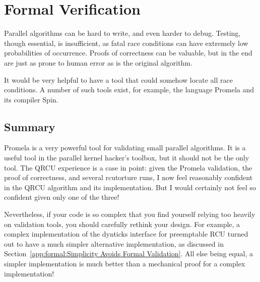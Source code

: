 
\chapter{Formal Verification}
\label{app:formal:Formal Verification}


Parallel algorithms can be hard to write, and even harder to debug.
Testing, though essential, is insufficient, as fatal race conditions
can have extremely low probabilities of occurrence.
Proofs of correctness can be valuable, but in the end are just as
prone to human error as is the original algorithm.

It would be very helpful to have a tool that could somehow locate
all race conditions.
A number of such tools exist, for example,
the language Promela and its compiler Spin.




\section{Summary}
\label{app:formal:Summary}

Promela is a very powerful tool for validating small parallel algorithms.
It is a useful tool in the parallel kernel hacker's toolbox, but
it should not be the only tool.
The QRCU experience is a case in point: given the Promela validation,
the proof of correctness, and several
rcutorture
runs, I now feel
reasonably confident in the QRCU algorithm and its implementation.
But I would certainly not feel so confident given only one of the three!

Nevertheless, if your code is so complex that you find yourself
relying too heavily on validation
tools, you should carefully rethink your design.
For example, a complex implementation of the dynticks interface for
preemptable RCU turned out to
have a much simpler alternative implementation, as discussed in
Section~\ref{app:formal:Simplicity Avoids Formal Validation}.
All else being equal, a simpler implementation is much better than
a mechanical proof for a complex implementation!
